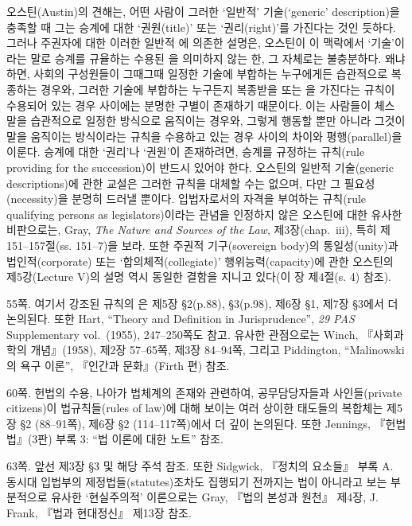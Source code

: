 {오스틴(Austin)의 견해는, 어떤 사람이 그러한 ‘일반적’ 기술(`generic'
description)을 충족할 때 그는 승계에 대한 ‘권원(title)’ 또는
‘권리(right)’를 가진다는 것인 듯하다. 그러나 주권자에 대한 이러한 일반적
에 의존한 설명은, 오스틴이 이 맥락에서
‘기술’이라는 말로 승계를 규율하는 수용된 을 의미하지 않는 한,
그 자체로는 불충분하다. 왜냐하면, 사회의 구성원들이  그때그때 일정한 기술에 부합하는 누구에게든 습관적으로
복종하는 경우와, 그러한 기술에 부합하는 누구든지 복종받을 
또는 을 가진다는 규칙이 수용되어 있는 경우 사이에는 분명한
구별이 존재하기 때문이다. 이는 사람들이 체스 말을 습관적으로 일정한
방식으로 움직이는 경우와, 그렇게 행동할 뿐만 아니라 그것이 말을 움직이는
 방식이라는 규칙을 수용하고 있는 경우 사이의 차이와
평행(parallel)을 이룬다. 승계에 대한 ‘권리’나 ‘권원’이 존재하려면,
승계를 규정하는 규칙(rule providing for the succession)이 반드시 있어야
한다. 오스틴의 일반적 기술(generic descriptions)에 관한 교설은 그러한
규칙을 대체할 수는 없으며, 다만 그 필요성(necessity)을 분명히 드러낼
뿐이다. 입법자로서의 자격을 부여하는 규칙(rule qualifying persons as
legislators)이라는 관념을 인정하지 않은 오스틴에 대한 유사한 비판으로는,
Gray, \emph{The Nature and Sources of the Law}, 제3장(chap.~iii), 특히
제151--157절(ss. 151--7)을 보라. 또한 주권적 기구(sovereign body)의
통일성(unity)과 법인적(corporate) 또는 ‘합의체적(collegiate)’
행위능력(capacity)에 관한 오스틴의 제5강(Lecture V)의 설명 역시 동일한
결함을 지니고 있다(이 장 제4절(s. 4) 참조).

\noteentry 55쪽.  여기서 강조된 규칙의 은 제5장 §2(p.88), §3(p.98), 제6장 §1, 제7장 §3에서 더 논의된다.
또한 Hart, “Theory and Definition in Jurisprudence”, \emph{29 PAS}
Supplementary vol.~(1955), 247--250쪽도 참고. 유사한 관점으로는 Winch,
『사회과학의 개념』(1958), 제2장 57--65쪽, 제3장 84--94쪽, 그리고
Piddington, “Malinowski의 욕구 이론”, 『인간과 문화』(Firth 편) 참조.

\noteentry 60쪽.  헌법의 수용, 나아가
법체계의 존재와 관련하여, 공무담당자들과 사인들(private citizens)이
법규칙들(rules of law)에 대해 보이는 여러 상이한 태도들의 복합체는 제5장
§2 (88--91쪽), 제6장 §2 (114--117쪽)에서 더 깊이 논의된다. 또한
Jennings, 『헌법법』(3판) 부록 3: “법 이론에 대한 노트” 참조.

\noteentry 63쪽.  앞선 제3장 §3 및 해당 주석 참조.
또한 Sidgwick, 『정치의 요소들』 부록 A. 동시대 입법부의
제정법들(statutes)조차도 집행되기 전까지는 법이 아니라고 보는 부분적으로
유사한 ‘현실주의적’ 이론으로는 Gray, 『법의 본성과 원천』 제4장, J.
Frank, 『법과 현대정신』 제13장 참조.

}
